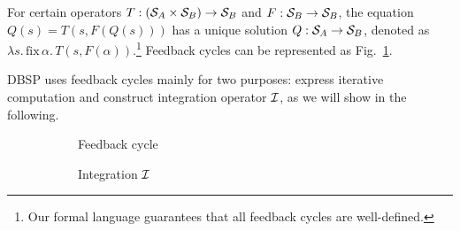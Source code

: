 \begin{definition}\label{def:feedback-cycle}
For certain operators $T: (\mathcal{S}_{A} \times \mathcal{S}_{B}) \to \mathcal{S}_{B}$ and $F: \mathcal{S}_{B} \to \mathcal{S}_{B}$, the equation $Q(s) = T(s, F(Q(s)))$ has a unique solution $Q: \mathcal{S}_{A} \to \mathcal{S}_{B}$, denoted as $\lambda s.\, \mathrm{fix}\, \alpha.\, T(s, F(\alpha))$.\footnote{Our formal language guarantees that all feedback cycles are well-defined.} Feedback cycles can be represented as Fig.~\ref{fig:feedback-cycle}.
\end{definition}

DBSP uses feedback cycles mainly for two purposes: express iterative computation and construct integration operator $\mathcal{I}$, as we will show in the following.

\begin{figure}[ht]
    \centering
    \begin{subfigure}[b]{0.3\textwidth}
        \centering
        \caption{Feedback cycle}
        \label{fig:feedback-cycle}
    \end{subfigure}
    \hfill
    \begin{subfigure}[b]{0.3\textwidth}
        \centering
        \caption{Integration $\mathcal{I}$}
        \label{fig:integration}
    \end{subfigure}
    \hfill
    \begin{subfigure}[b]{0.3\textwidth}

\end{subfigure}
\end{figure}
